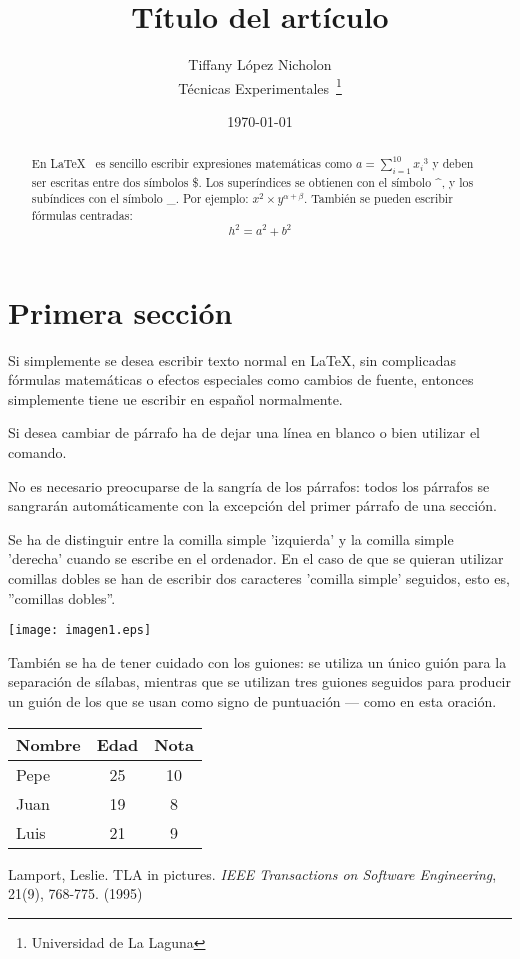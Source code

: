 \documentclass[a4paper,12pt]{article}
\begin{document}
\title{Título del artículo}
\author{Tiffany López Nicholon \\
	Técnicas Experimentales~\footnote{Universidad de La Laguna}
	}
\date{\today}
\maketitle
\begin{abstract}
	En \LaTeX{}~\cite{Lam:86} es sencillo escribir expresiones
	matemáticas como $a=\sum_{i=1}^{10} {x_i}^{3}$
	y deben ser escritas entre dos símbolos \$.
	Los superíndices se obtienen con el símbolo \^{}, y 
	los subíndices con el símbolo \_.
	Por ejemplo: $x^2\times y^{\alpha + \beta}$.
	También se pueden escribir fórmulas centradas:
	\[h^2=a^2 + b^2 \]
\end{abstract}

\section{Primera sección}
Si simplemente se desea escribir texto normal en LaTeX, 
sin complicadas f\'ormulas matem\'aticas o efectos especiales
como cambios de fuente, entonces simplemente tiene ue escribir
en espa\~nol normalmente.\par
Si desea cambiar de párrafo ha de dejar una línea en blanco o bien
utilizar el comando. \par
No es necesario preocuparse de la sangría de los párrafos:
todos los párrafos se sangrarán automáticamente con la excepción
del primer párrafo de una sección.


Se ha de distinguir entre la comilla simple 'izquierda'
y la comilla simple 'derecha' cuando se escribe en el ordenador.
En el caso de que se quieran utilizar co\-mi\-llas dobles se han de
escribir dos caracteres 'comilla simple' seguidos, esto es,
''comillas dobles''.

\texttt{[image: imagen1.eps]}


También se ha de tener cuidado con los guiones: se utiliza un único
guión para la separación de sílabas, mientras que se utilizan
tres guiones seguidos para producir un guión de los que se usan
como signo de puntuación --- como en esta oración.

\bigskip
\begin{tabular}{|l|c|c|}
\hline
	Nombre & Edad & Nota \\ \hline
	Pepe & 25 & 10 \\ \hline
	Juan & 19 & 8 \\ \hline
	Luis & 21 & 9 \\ \hline
\end{tabular}


\begin{thebibliography}{00}
		Lamport, Leslie.
		TLA in pictures.
		\emph{IEEE Transactions on Software Engineering},
		21(9), 768-775.
		(1995)
\end{thebibliography}
\end{document}
